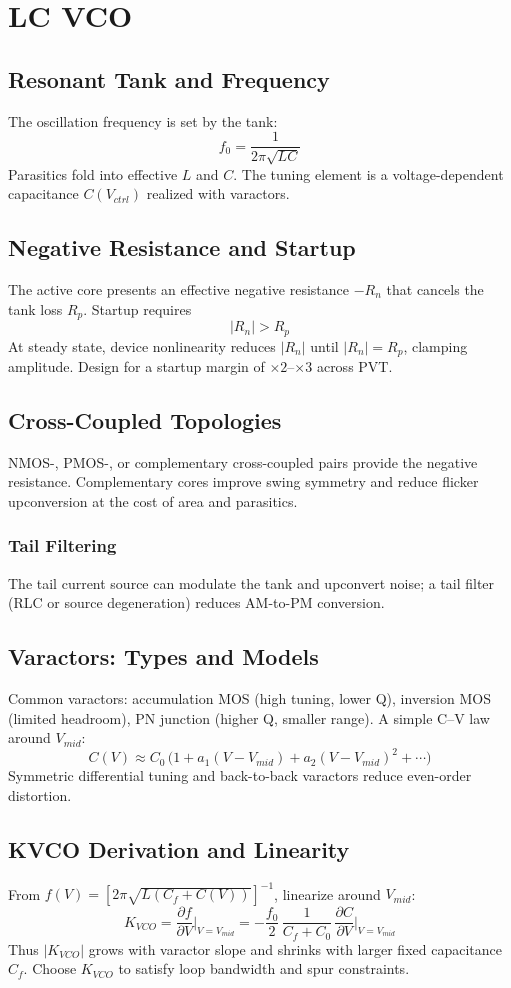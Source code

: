 \chapter{LC VCO}
\section{Resonant Tank and Frequency}
The oscillation frequency is set by the tank:
\[
 f_0 = \frac{1}{2\pi\sqrt{LC}}
\]
Parasitics fold into effective \(L\) and \(C\). The tuning element is a voltage-dependent capacitance \(C(V_{ctrl})\) realized with varactors.

\section{Negative Resistance and Startup}
The active core presents an effective negative resistance \(-R_n\) that cancels the tank loss \(R_p\). Startup requires
\[
 |R_n| > R_p
\]
At steady state, device nonlinearity reduces \(|R_n|\) until \(|R_n| = R_p\), clamping amplitude. Design for a startup margin of $\times 2$–$\times 3$ across PVT.

\section{Cross-Coupled Topologies}
NMOS-, PMOS-, or complementary cross-coupled pairs provide the negative resistance. Complementary cores improve swing symmetry and reduce flicker upconversion at the cost of area and parasitics.

\subsection*{Tail Filtering}
The tail current source can modulate the tank and upconvert noise; a tail filter (RLC or source degeneration) reduces AM-to-PM conversion.

\section{Varactors: Types and Models}
Common varactors: accumulation MOS (high tuning, lower Q), inversion MOS (limited headroom), PN junction (higher Q, smaller range). A simple C–V law around \(V_{mid}\):
\[
 C(V) \approx C_0\,\big(1 + a_1 (V-V_{mid}) + a_2 (V-V_{mid})^2 + \cdots \big)
\]
Symmetric differential tuning and back-to-back varactors reduce even-order distortion.

\section{KVCO Derivation and Linearity}
From \( f(V) = [2\pi\sqrt{L(C_f + C(V))}]^{-1} \), linearize around \(V_{mid}\):
\[
 K_{VCO} = \frac{\partial f}{\partial V}\Big|_{V=V_{mid}} = -\frac{f_0}{2}\,\frac{1}{C_f + C_0}\,\frac{\partial C}{\partial V}\Big|_{V=V_{mid}}
\]
Thus \(|K_{VCO}|\) grows with varactor slope and shrinks with larger fixed capacitance \(C_f\). Choose \(K_{VCO}\) to satisfy loop bandwidth and spur constraints.

